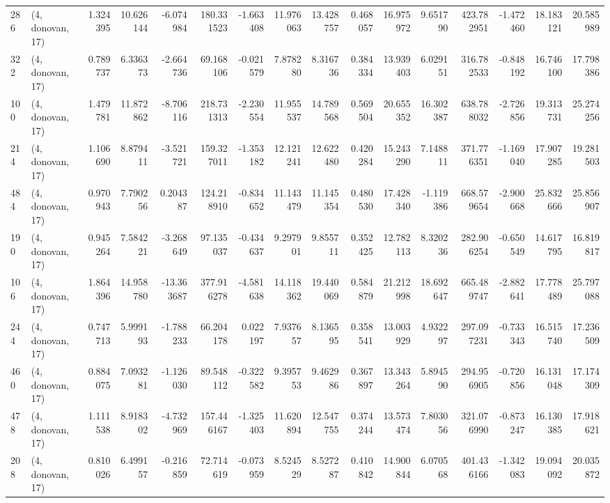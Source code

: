 \begin{tabular}{llrrrrrrrrrrrrrr}
286 &  (4, donovan, 17) &   1.324395 &  10.626144 &  -6.074984 &   180.331523 &  -1.663408 &  11.976063 &  13.428757 &  0.468057 &  16.975972 &   9.651790 &   423.782951 &  -1.472460 &  18.183121 &  20.585989 \\
322 &  (4, donovan, 17) &   0.789737 &   6.336373 &  -2.664736 &    69.168106 &  -0.021579 &   7.878280 &   8.316736 &  0.384334 &  13.939403 &   6.029151 &   316.782533 &  -0.848192 &  16.746100 &  17.798386 \\
100 &  (4, donovan, 17) &   1.479781 &  11.872862 &  -8.706116 &   218.731313 &  -2.230554 &  11.955537 &  14.789568 &  0.569504 &  20.655352 &  16.302387 &   638.788032 &  -2.726856 &  19.313731 &  25.274256 \\
214 &  (4, donovan, 17) &   1.106690 &   8.879411 &  -3.521721 &   159.327011 &  -1.353182 &  12.121241 &  12.622480 &  0.420284 &  15.243290 &   7.148811 &   371.776351 &  -1.169040 &  17.907285 &  19.281503 \\
484 &  (4, donovan, 17) &   0.970943 &   7.790256 &   0.204387 &   124.218910 &  -0.834652 &  11.143479 &  11.145354 &  0.480530 &  17.428340 &  -1.119386 &   668.579654 &  -2.900668 &  25.832666 &  25.856907 \\
190 &  (4, donovan, 17) &   0.945264 &   7.584221 &  -3.268649 &    97.135037 &  -0.434637 &   9.297901 &   9.855711 &  0.352425 &  12.782113 &   8.320236 &   282.906254 &  -0.650549 &  14.617795 &  16.819817 \\
106 &  (4, donovan, 17) &   1.864396 &  14.958780 & -13.363687 &   377.916278 &  -4.581638 &  14.118362 &  19.440069 &  0.584879 &  21.212998 &  18.692647 &   665.489747 &  -2.882641 &  17.778489 &  25.797088 \\
244 &  (4, donovan, 17) &   0.747713 &   5.999193 &  -1.788233 &    66.204178 &   0.022197 &   7.937657 &   8.136595 &  0.358541 &  13.003929 &   4.932297 &   297.097231 &  -0.733343 &  16.515740 &  17.236509 \\
460 &  (4, donovan, 17) &   0.884075 &   7.093281 &  -1.126030 &    89.548112 &  -0.322582 &   9.395753 &   9.462986 &  0.367897 &  13.343264 &   5.894590 &   294.956905 &  -0.720856 &  16.131048 &  17.174309 \\
478 &  (4, donovan, 17) &   1.111538 &   8.918302 &  -4.732969 &   157.446167 &  -1.325403 &  11.620894 &  12.547755 &  0.374244 &  13.573474 &   7.803056 &   321.076990 &  -0.873247 &  16.130385 &  17.918621 \\
208 &  (4, donovan, 17) &   0.810026 &   6.499157 &  -0.216859 &    72.714619 &  -0.073959 &   8.524529 &   8.527287 &  0.410842 &  14.900844 &   6.070568 &   401.436166 &  -1.342083 &  19.094092 &  20.035872 \\

\end{tabular}
